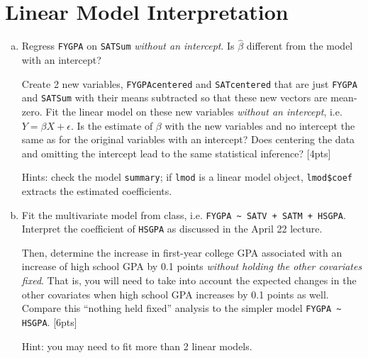 \documentclass[12pt]{article}
\begin{document}
\section{Linear Model Interpretation}

\begin{enumerate}[(a)]
	\item Regress \verb|FYGPA| on \verb|SATSum| \textit{without an intercept}. Is $\hat{\beta}$ different from the model with an intercept?
	
	Create 2 new variables, \verb|FYGPAcentered| and \verb|SATcentered| that are just \verb|FYGPA| and \verb|SATSum| with their means subtracted so that these new vectors are mean-zero. Fit the linear model on these new variables \textit{without an intercept}, i.e. $Y = \beta X + \epsilon$. Is the estimate of $\beta$ with the new variables and no intercept the same as for the original variables with an intercept? Does centering the data and omitting the intercept lead to the same statistical inference? [4pts]
	
	Hints: check the model \verb|summary|; if \verb|lmod| is a linear model object, \verb|lmod$coef| extracts the estimated coefficients.
	
	\item Fit the multivariate model from class, i.e. \verb|FYGPA ~ SATV + SATM + HSGPA|. Interpret the coefficient of \verb|HSGPA| as discussed in the April 22 lecture.
	
	Then, determine the increase in first-year college GPA associated with an increase of high school GPA by 0.1 points \textit{without holding the other covariates fixed}. That is, you will need to take into account the expected changes in the other covariates when high school GPA increases by 0.1 points as well. Compare this ``nothing held fixed'' analysis to the simpler model \verb|FYGPA ~ HSGPA|. [6pts]
	
	Hint: you may need to fit more than 2 linear models.
\end{enumerate}
\end{document}
